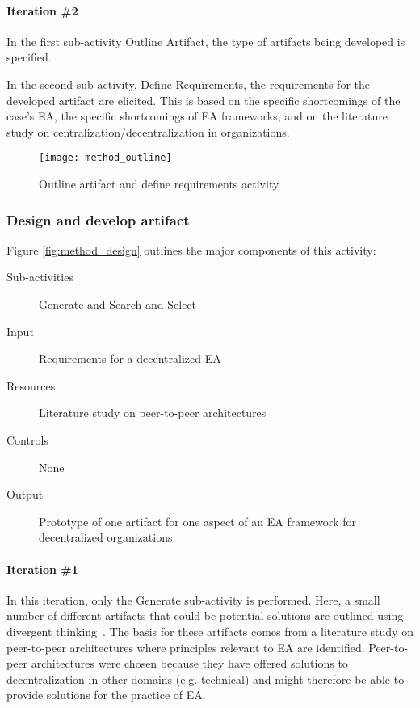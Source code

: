 \paragraph{Iteration \#2}

In the first sub-activity Outline Artifact, the type of artifacts being developed is specified. 

In the second sub-activity, Define Requirements, the requirements for the developed artifact are elicited. This is based on the specific shortcomings of the case's EA, the specific shortcomings of EA frameworks, and on the literature study on centralization/decentralization in organizations.


\begin{figure}
\texttt{[image: method\_outline]}
\caption{Outline artifact and define requirements activity}
\label{fig:method_outline}
\end{figure}

\subsubsection*{Design and develop artifact}

Figure \ref{fig:method_design} outlines the major components of this activity:
\begin{description}
  \item[Sub-activities] Generate and Search and Select~\cite[Ch. 7]{johannessonPerjons2012}
  \item[Input]  Requirements for a decentralized EA 
  \item[Resources] Literature study on peer-to-peer architectures
  \item[Controls] None
  \item[Output] Prototype of one artifact for one aspect of an EA framework for decentralized organizations 
\end{description}

\paragraph{Iteration \#1}

In this iteration, only the Generate sub-activity is performed. Here, a small number of different artifacts that could be potential solutions are outlined using divergent thinking~\cite[Ch. 7.1]{johannessonPerjons2012}. The basis for these artifacts comes from a literature study on peer-to-peer architectures where principles relevant to EA are identified. Peer-to-peer architectures were chosen because they have offered solutions to decentralization in other domains (e.g. technical) and might therefore be able to provide solutions for the practice of EA. 

